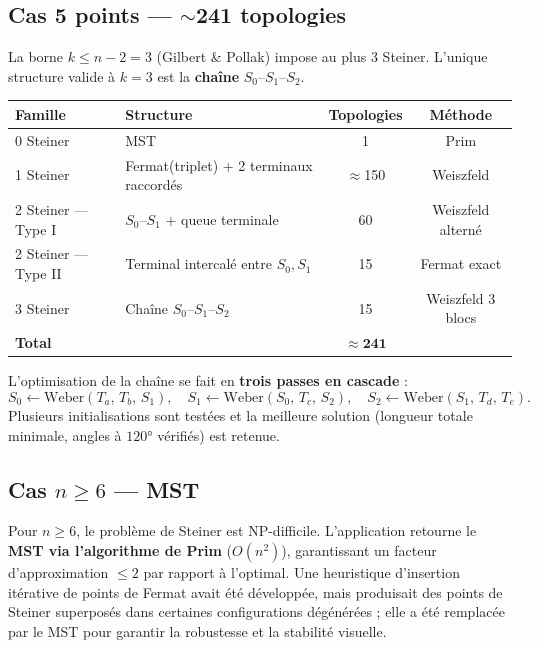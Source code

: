 \documentclass[11pt, a4paper]{article}
\begin{document}
\subsection{Cas 5 points — $\sim$241 topologies}

La borne $k \leq n-2 = 3$ (Gilbert \& Pollak) impose au plus 3 Steiner.
L'unique structure valide à $k=3$ est la \textbf{chaîne} $S_0$–$S_1$–$S_2$.

\begin{center}
\small\setlength{\tabcolsep}{5pt}
\begin{tabular}{@{}p{2.8cm} p{4.8cm} cc@{}}
\toprule
\textbf{Famille} & \textbf{Structure} & \textbf{Topologies} & \textbf{Méthode} \\
\midrule
0 Steiner & MST & 1 & Prim \\
1 Steiner & Fermat(triplet) + 2 terminaux raccordés & $\approx$150 & Weiszfeld \\
2 Steiner — Type I & $S_0$–$S_1$ + queue terminale & 60 & Weiszfeld alterné \\
2 Steiner — Type II & Terminal intercalé entre $S_0, S_1$ & 15 & Fermat exact \\
3 Steiner & Chaîne $S_0$–$S_1$–$S_2$ & 15 & Weiszfeld 3 blocs \\
\midrule
\textbf{Total} && $\bm{\approx 241}$ & \\
\bottomrule
\end{tabular}
\end{center}

L'optimisation de la chaîne se fait en \textbf{trois passes en cascade} :
\[
  S_0 \leftarrow \mathrm{Weber}(T_a,\, T_b,\, S_1),\quad
  S_1 \leftarrow \mathrm{Weber}(S_0,\, T_c,\, S_2),\quad
  S_2 \leftarrow \mathrm{Weber}(S_1,\, T_d,\, T_e).
\]
Plusieurs initialisations sont testées et la meilleure solution (longueur totale minimale,
angles à $120°$ vérifiés) est retenue.

\subsection{Cas $n \geq 6$ — MST}

Pour $n \geq 6$, le problème de Steiner est NP-difficile.
L'application retourne le \textbf{MST via l'algorithme de Prim} ($O(n^2)$),
garantissant un facteur d'approximation $\leq 2$ par rapport à l'optimal.
Une heuristique d'insertion itérative de points de Fermat avait été développée, mais
produisait des points de Steiner superposés dans certaines configurations dégénérées ;
elle a été remplacée par le MST pour garantir la robustesse et la stabilité visuelle.
\end{document}

